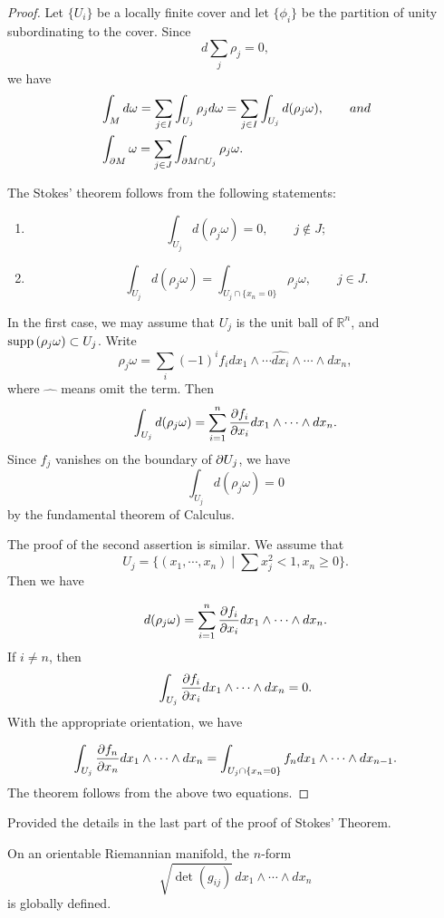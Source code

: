 \begin{proof}  Let $\{U_i\}$ be a locally finite cover and let $\{\phi_i\}$ be the partition of unity subordinating to the cover. Since
\[
d\sum_j\rho_j=0,
\]
we have
\begin{align*}
&
\int_M d\omega=\sum_{j\in I}\int_{U_j}\rho_jd\omega=\sum_{j\in I}\int_{U_j}d(\rho_j\omega), \qquad and\\&
\int_{\partial M}\omega=\sum_{j\in J}\int_{\partial M\cap U_j}\rho_j\omega.
\end{align*}

The Stokes' theorem follows from the following statements:
\begin{enumerate}
\item 
\[
\int_{U_j}d(\rho_j\omega)=0,\qquad j\not\in J;
\]

\item 
\[
\int_{U_j}d(\rho_j\omega)=\int_{U_j\cap\{x_n=0\}}\rho_j\omega,\qquad j\in J.
\]
\end{enumerate}

In the first case, we may assume that $U_j$ is the unit ball of $\mathbb R^n$, and ${\rm supp}\,(\rho_j\omega)\subset U_j$. Write
\[
\rho_j\omega=\sum_i (-1)^i f_i dx_1\wedge\cdots \hat{dx_i}\wedge\cdots\wedge dx_n,
\]
where $\hat{\quad}$ means omit the term.
Then
\[
\int_{U_j} d(\rho_j\omega)=\sum_{i=1}^n\frac{\partial f_i}{\partial x_i} dx_1\wedge\cdots\wedge dx_n.
\]
Since $f_j$ vanishes on the boundary of $\partial U_j$, we have
\[
\int_{U_j}d(\rho_j\omega)=0
\]
by the fundamental theorem of Calculus.

The proof of the second assertion is similar. We assume that
\[
U_j=\{(x_1,\cdots,x_n)\mid\sum x_j^2<1, x_n\geq 0\}.
\]
Then we have

\[
d(\rho_j\omega)=\sum_{i=1}^n \frac{\partial f_i}{\partial x_i}dx_1\wedge\cdots\wedge dx_n.
\]
If $i\neq n$, then
\[
\int_{U_j}\frac{\partial f_i}{\partial x_i}dx_1\wedge\cdots\wedge dx_n=0.
\]
With the appropriate orientation, we have

\[
\int_{U_j}\frac{\partial f_n}{\partial x_n}dx_1\wedge\cdots\wedge dx_n=\int_{U_j\cap \{x_n=0\}} f_n dx_1\wedge\cdots\wedge d x_{n-1}.
\]
The theorem follows from the above two equations. 
\end{proof}

\begin{ex} Provided the details in the last part of the proof of Stokes' Theorem.
\end{ex}


\begin{lemma} On an orientable Riemannian manifold, the $n$-form
\[
\sqrt{\det(g_{ij})}\, dx_1\wedge\cdots\wedge dx_n
\]
is globally defined.
\end{lemma}

